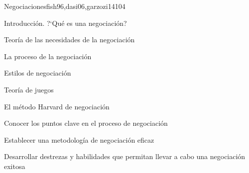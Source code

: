 \begin{syllabus}
   \begin{unit}{Negociaciones}{}{fish96,dasi06,garzozi14}{10}{4}
   \begin{topics}
         \item Introducción. ?`Qué es una negociación?
         \item Teoría de las necesidades de la negociación
         \item La proceso de la negociación
         \item Estilos de negociación
         \item Teoría de juegos
         \item El método Harvard de negociación
      \end{topics}
      \begin{learningoutcomes}
         \item Conocer los puntos clave en el proceso de negociación
         \item Establecer una metodología de negociación eficaz
         \item Desarrollar destrezas y habilidades que permitan llevar a cabo una negociación exitosa
      \end{learningoutcomes}
   \end{unit}
   
   
   
   
   
   
   \begin{coursebibliography}
   \end{coursebibliography}
   
   \end{syllabus}
   
   
